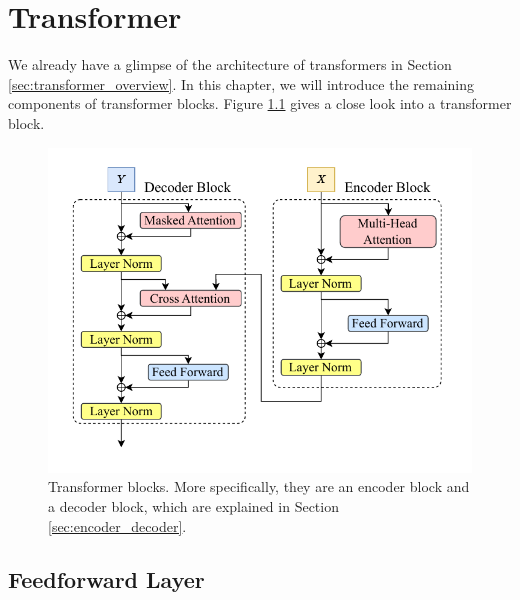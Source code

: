 \chapter{Transformer} \label{chap:transformer}

We already have a glimpse of the architecture of transformers in Section \ref{sec:transformer_overview}. In this chapter, we will introduce the remaining components of transformer blocks. Figure \ref{fig:encoder_decoder} gives a close look into a transformer block.

\begin{figure}
    \centering
    \includegraphics[width=0.8\linewidth]{fig/encoder_decoder.pdf}
    \caption{Transformer blocks. More specifically, they are an encoder block and a decoder block, which are explained in Section \ref{sec:encoder_decoder}.}
    \label{fig:encoder_decoder}
\end{figure}



\section{Feedforward Layer}

